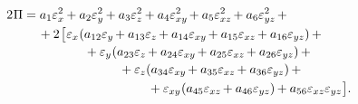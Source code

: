 \begin{otherlanguage}{russian}
\nopagebreak\vspace{-0.2em}\begin{equation}\label{elasticenergylooongcartesian}
\begin{gathered}
\hspace{-5em}
2 \hspace{.1ex} \potential
= a_1 \varepsilon^2_{x} \hspace{-0.1ex} + a_2 \varepsilon^2_{y} \hspace{-0.1ex} + a_3 \varepsilon^2_{z} \hspace{-0.1ex} + a_4 \varepsilon^2_{xy} \hspace{-0.2ex} + a_5 \varepsilon^2_{xz} \hspace{-0.2ex} + a_6 \varepsilon^2_{yz} \hspace{-0.2ex} +{}
\\[-0.1em]
\hspace{.2em}
{}+ 2 \hspace{.2ex} \bigl[ \hspace{.1ex}
\varepsilon_{x} \hspace{.1ex} ( a_{12} \varepsilon_{y} \hspace{-0.2ex} + a_{13} \varepsilon_{z} \hspace{-0.2ex} + a_{14} \varepsilon_{xy} \hspace{-0.2ex} + a_{15} \varepsilon_{xz} \hspace{-0.2ex} + a_{16} \varepsilon_{yz} ) \hspace{-0.11ex} +{}
\\[-0.1em]
\hspace{3em}
{}+ \varepsilon_{y} \hspace{.1ex} ( a_{23} \varepsilon_{z} \hspace{-0.2ex} + a_{24} \varepsilon_{xy} \hspace{-0.2ex} + a_{25} \varepsilon_{xz} \hspace{-0.2ex} + a_{26} \varepsilon_{yz} ) \hspace{-0.11ex} +{}
\\[-0.1em]
\hspace{5em}
{}+ \varepsilon_{z} ( a_{34} \varepsilon_{xy} \hspace{-0.2ex} + a_{35} \varepsilon_{xz} \hspace{-0.2ex} + a_{36} \varepsilon_{yz} ) \hspace{-0.11ex} +{}
\\[-0.1em]
\hspace{11em}
{}+ \varepsilon_{xy} \hspace{.1ex} ( a_{45} \varepsilon_{xz} \hspace{-0.2ex} + a_{46} \varepsilon_{yz} ) \hspace{-0.11ex}
+ a_{56} \varepsilon_{xz} \varepsilon_{yz} \hspace{.1ex} \bigr]
.
\end{gathered}\end{equation}


\end{otherlanguage}
